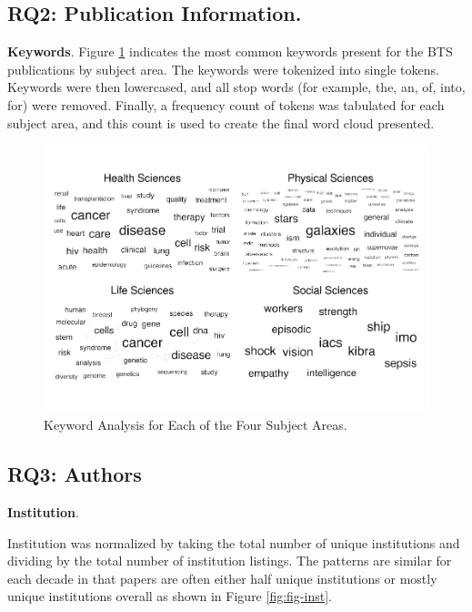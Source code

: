 \documentclass[
  man,floatsintext]{apa6}
\begin{document}
\hypertarget{rq2-publication-information.-1}{%
\subsection{RQ2: Publication Information.}\label{rq2-publication-information.-1}}

\textbf{Keywords}. Figure \ref{fig:fig-keywords} indicates the most common keywords present for the BTS publications by subject area. The keywords were tokenized into single tokens. Keywords were then lowercased, and all stop words (for example, the, an, of, into, for) were removed. Finally, a frequency count of tokens was tabulated for each subject area, and this count is used to create the final word cloud presented.

\begin{figure}
\centering
\includegraphics{manuscript_scopus_files/figure-latex/fig-keywords-1.pdf}
\caption{\label{fig:fig-keywords}Keyword Analysis for Each of the Four Subject Areas.}
\end{figure}

\hypertarget{rq3-authors}{%
\subsection{RQ3: Authors}\label{rq3-authors}}

\textbf{Institution}.

Institution was normalized by taking the total number of unique institutions and dividing by the total number of institution listings. The patterns are similar for each decade in that papers are often either half unique institutions or mostly unique institutions overall as shown in Figure \ref{fig:fig-inst}.
\end{document}
